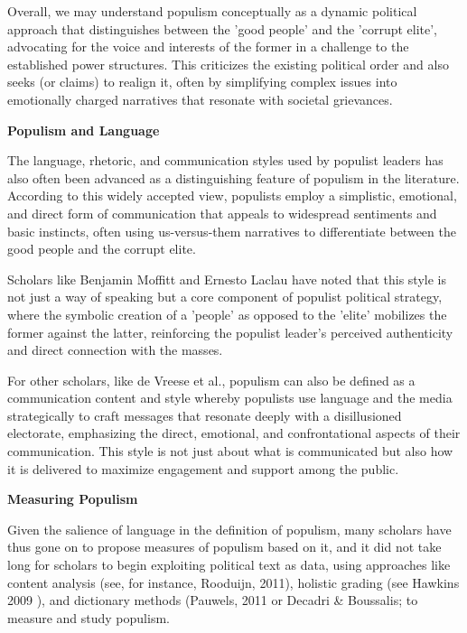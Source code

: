 \documentclass[12pt,letterpaper]{article}
\begin{document}
Overall, we may understand populism conceptually as a dynamic political approach that distinguishes  between the 'good people' and the 'corrupt elite', advocating for the voice and interests of the former in a challenge to the established power structures. This criticizes the existing political order and also  seeks (or claims) to realign it, often by simplifying complex issues into emotionally charged narratives that resonate with societal grievances.

\vspace{.25cm}
\noindent \textbf{Populism and Language}
\vspace{.25cm}

\noindent The language, rhetoric, and communication styles used by populist leaders has also often been advanced as a distinguishing feature of populism in the literature. According to this widely accepted view, populists employ a simplistic, emotional, and direct form of communication that appeals to widespread sentiments and basic instincts, often using us-versus-them narratives to differentiate between the good people and the corrupt elite. 

Scholars like Benjamin Moffitt\autocite{moffittGlobalRisePopulism2016} and Ernesto Laclau \autocite{benvenutoPopulistReasonErnesto2012} have noted that this style is not just a way of speaking but a core component of populist political strategy, where the symbolic creation of a 'people' as opposed to the 'elite' mobilizes the former against the latter, reinforcing the populist leader's perceived authenticity and direct connection with the masses. 

For other scholars, like de Vreese et al.\autocite{devreesePopulismExpressionPolitical2018}, populism can also be defined as a communication content and style whereby populists use language and the media strategically to craft messages that resonate deeply with a disillusioned electorate, emphasizing the direct, emotional, and confrontational aspects of their communication. This style is not just about what is communicated but also how it is delivered to maximize engagement and support among the public. 

\vspace{.25cm}
\noindent \textbf{Measuring Populism}
\vspace{.25cm}

\noindent Given the salience of language in the definition of populism, many scholars have thus gone on to propose measures of populism based on it, and it did not take long for scholars to begin exploiting political text as data, using approaches like content analysis (see, for instance, Rooduijn, 2011\autocite{rooduijnMeasuringPopulismComparing2011}), holistic grading (see Hawkins 2009 \autocite{hawkinsChavezPopulistMeasuring2009}), and dictionary methods (Pauwels, 2011\autocite{pauwelsMeasuringPopulismQuantitative2011} or Decadri \& Boussalis\autocite{decadriPopulismPartyMembership2020}; to measure and study populism. 
\end{document}

